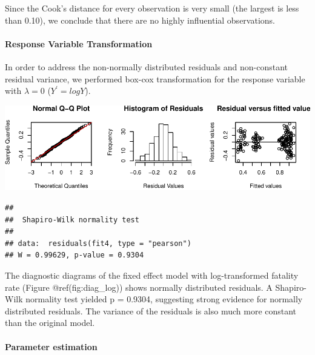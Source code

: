 \documentclass[]{article}
\let\oldparagraph\paragraph
\renewcommand{\paragraph}[1]{\oldparagraph{#1}\mbox{}}
\let\origfigure\figure
\let\endorigfigure\endfigure
\renewenvironment{figure}[1][2] {
    \expandafter\origfigure\expandafter[H]
} {
    \endorigfigure
}
\begin{document}
Since the Cook's distance for every observation is very small (the largest is less than 0.10), we conclude that there are no highly influential observations.

\hypertarget{response-variable-transformation}{%
\paragraph{Response Variable Transformation}\label{response-variable-transformation}}

In order to address the non-normally distributed residuals and non-constant residual variance, we performed box-cox transformation for the response variable with \(\lambda = 0\) (\(Y^{'} = logY\)).

\begin{figure}
\centering
\includegraphics{team6_final_project_3_files/figure-latex/diag_log-1.pdf}
\caption{(\#fig:diag\_log)Visual diagnostics of Fixed Effect model assumptions with log transformed response variable. (a). Normal Q-Q plot of residuals. (b) Histogram of model residuals. (c) Residuals-versus-fitted value scatter plot.}
\end{figure}

\begin{verbatim}
## 
##  Shapiro-Wilk normality test
## 
## data:  residuals(fit4, type = "pearson")
## W = 0.99629, p-value = 0.9304
\end{verbatim}

The diagnostic diagrams of the fixed effect model with log-transformed fatality rate (Figure @ref(fig:diag\_log)) shows normally distributed residuals. A Shapiro-Wilk normality test yielded p = 0.9304, suggesting strong evidence for normally distributed residuals. The variance of the residuals is also much more constant than the original model.

\hypertarget{parameter-estimation}{%
\paragraph{Parameter estimation}\label{parameter-estimation}}
\end{document}
